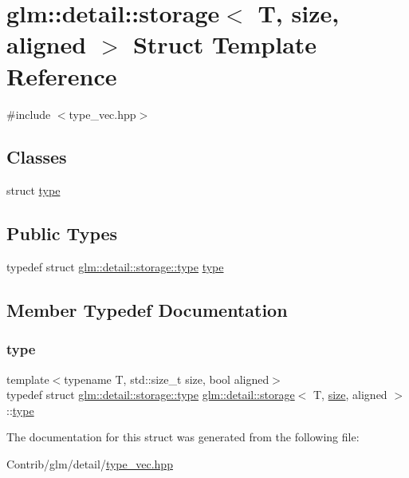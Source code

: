 \hypertarget{structglm_1_1detail_1_1storage}{}\section{glm\+:\+:detail\+:\+:storage$<$ T, size, aligned $>$ Struct Template Reference}
\label{structglm_1_1detail_1_1storage}


{\ttfamily \#include $<$type\+\_\+vec.\+hpp$>$}

\subsection*{Classes}
\begin{DoxyCompactItemize}
\item 
struct \mbox{\hyperlink{structglm_1_1detail_1_1storage_1_1type}{type}}
\end{DoxyCompactItemize}
\subsection*{Public Types}
\begin{DoxyCompactItemize}
\item 
typedef struct \mbox{\hyperlink{structglm_1_1detail_1_1storage_1_1type}{glm\+::detail\+::storage\+::type}} \mbox{\hyperlink{structglm_1_1detail_1_1storage_a11188a4949646a1c74aea5181fc8213d}{type}}
\end{DoxyCompactItemize}


\subsection{Member Typedef Documentation}
\mbox{\label{structglm_1_1detail_1_1storage_a11188a4949646a1c74aea5181fc8213d}} 
\subsubsection{\texorpdfstring{type}{type}}
{\footnotesize\ttfamily template$<$typename T, std\+::size\+\_\+t size, bool aligned$>$ \\
typedef struct \mbox{\hyperlink{structglm_1_1detail_1_1storage_1_1type}{glm\+::detail\+::storage\+::type}}  \mbox{\hyperlink{structglm_1_1detail_1_1storage}{glm\+::detail\+::storage}}$<$ T, \mbox{\hyperlink{_s_d_l__opengl__glext_8h_a3d1e3edfcf61ca2d831883e1afbad89e}{size}}, aligned $>$\+::\mbox{\hyperlink{structglm_1_1detail_1_1storage_1_1type}{type}}}



The documentation for this struct was generated from the following file\+:\begin{DoxyCompactItemize}
\item 
Contrib/glm/detail/\mbox{\hyperlink{type__vec_8hpp}{type\+\_\+vec.\+hpp}}\end{DoxyCompactItemize}
